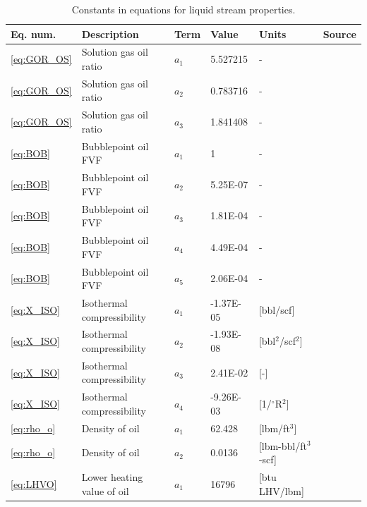 \documentclass[11pt]{report}
\begin{document}
\begin{table}
\begin{scriptsize}
\caption{Constants in equations for liquid stream properties.}
\label{tab:ConstantsLiquidFlowSheet}
\begin{tabularx}{1\columnwidth}{p{}p{}p{}p{}p{}p{}}
\toprule
Eq. num. 			& Description	 			& Term		& Value  		& Units		& Source \\
\midrule
\ref{eq:GOR_OS}	& Solution gas oil ratio		& $a_1$		& 5.527215	& -			& \cite{Alshammasi2001} \\
\ref{eq:GOR_OS}	& Solution gas oil ratio		& $a_2$		& 0.783716	& -			& \cite{Alshammasi2001} \\
\ref{eq:GOR_OS}	& Solution gas oil ratio		& $a_3$		& 1.841408	& -			& \cite{Alshammasi2001} \\
\midrule
\ref{eq:BOB}		& Bubblepoint oil FVF		& $a_1$		& 1			& -			& \cite{Alshammasi2001} \\
\ref{eq:BOB}		& Bubblepoint oil FVF		& $a_2$		& 5.25E-07	& -			& \cite{Alshammasi2001} \\
\ref{eq:BOB}		& Bubblepoint oil FVF		& $a_3$		& 1.81E-04	& -			& \cite{Alshammasi2001} \\
\ref{eq:BOB}		& Bubblepoint oil FVF		& $a_4$		& 4.49E-04	& -			& \cite{Alshammasi2001} \\
\ref{eq:BOB}		& Bubblepoint oil FVF		& $a_5$		& 2.06E-04	& -			& \cite{Alshammasi2001} \\
\midrule
\ref{eq:X_ISO}		& Isothermal compressibility	& $a_1$		& -1.37E-05	& [bbl/scf]			& \cite{Almarhoun1992} \\
\ref{eq:X_ISO}		& Isothermal compressibility	& $a_2$		& -1.93E-08	& [bbl$^2$/scf$^2$]			& \cite{Almarhoun1992} \\
\ref{eq:X_ISO}		& Isothermal compressibility	& $a_3$		& 2.41E-02	& [-]			& \cite{Almarhoun1992} \\
\ref{eq:X_ISO}		& Isothermal compressibility	& $a_4$		& -9.26E-03	& [1/$^\circ$R$^2$]			& \cite{Almarhoun1992} \\
\midrule
\ref{eq:rho_o}		& Density of oil				& $a_1$		& 62.428		& [lbm/ft$^3$]			& \cite{Fanchi2007} \\
\ref{eq:rho_o}		& Density of oil				& $a_2$		& 0.0136		& [lbm-bbl/ft$^3$-scf]			& \cite{Fanchi2007} \\
\midrule
\ref{eq:LHVO}		& Lower heating value of oil	& $a_1$		& 16796		& [btu LHV/lbm]	 & \cite{APITechDatabook} \\

\end{tabularx}
\end{scriptsize}
\end{table}
\end{document}
